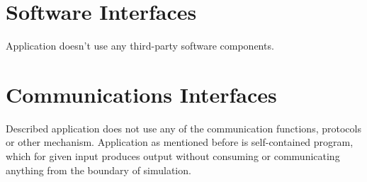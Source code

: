 \section{Software Interfaces}
	\begin{comment}
		$<$Describe the connections between this product and other specific software 
		components (name and version), including databases, operating systems, tools, 
		libraries, and integrated commercial components. Identify the data items or 
		messages coming into the system and going out and describe the purpose of each.  
		Describe the services needed and the nature of communications. Refer to 
		documents that describe detailed application programming interface protocols.  
		Identify data that will be shared across software components. If the data 
		sharing mechanism must be implemented in a specific way (for example, use of a 
		global data area in a multitasking operating system), specify this as an 
		implementation constraint.$>$
	\end{comment}
	Application doesn't use any third-party software components.
\section{Communications Interfaces}
	\begin{comment}
		$<$Describe the requirements associated with any communications functions 
		required by this product, including e-mail, web browser, network server 
		communications protocols, electronic forms, and so on. Define any pertinent 
		message formatting. Identify any communication standards that will be used, such 
		as FTP or HTTP. Specify any communication security or encryption issues, data 
		transfer rates, and synchronization mechanisms.$>$
	\end{comment}
	
	Described application does not use any of the communication functions, protocols or other mechanism. Application as mentioned before is self-contained program, which for given input produces output without consuming or communicating anything from the boundary of simulation.
